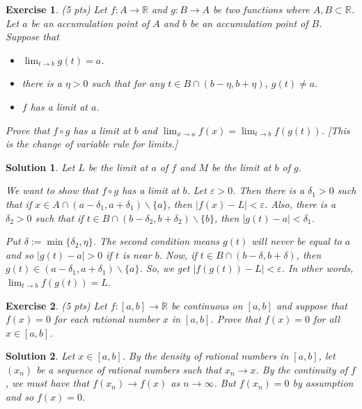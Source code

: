 \documentclass[12pt]{article}
\newcommand{\bR}{\mathbb{R}}
\newcommand{\ra}{\rightarrow}
\theoremstyle{plain}
\newtheorem{exer}{\textbf{Exercise}}}
\theoremstyle{plain}
\newtheorem*{sol}{\textbf{Solution}}}
\theoremstyle{plain}
\theoremstyle{plain}
\begin{document}
\begin{exer}
(5 pts)
Let $f : A \ra \bR$ and $g : B \ra A$ be two functions where $A, B \subset \bR$. Let $a$ be an accumulation point of $A$ and $b$ be an accumulation point of $B$. Suppose that
	\begin{itemize}
	\item $\lim_{t \ra b} g(t) = a$.
	\item there is a $\eta > 0$ such that for any $t \in B \cap (b - \eta ,  b + \eta )$, $g(t) \neq a$.
	\item $f$ has a limit at $a$.
	\end{itemize}
Prove that $f \circ g$ has a limit at $b$ and $\lim_{x \ra a} f(x) = \lim_{t \ra b} f(g(t))$. [This is the change of variable rule for limits.]
\end{exer}
\begin{sol}
Let $L$ be the limit at $a$ of $f$ and $M$ be the limit at $b$ of $g$.

We want to show that $f \circ g$ has a limit at $b$. Let $\varepsilon > 0$. Then there is a $\delta_1 > 0$ such that if $x \in A \cap (a - \delta_1 , a + \delta_1 ) \backslash \{ a \}$, then $|f(x) - L| < \varepsilon$. Also, there is a $\delta_2 > 0$ such that if $t \in B \cap (b - \delta_2 , b + \delta_2 )\backslash \{ b \}$, then $|g(t) - a| < \delta_1$. 

Put $\delta := \min \{ \delta_2 , \eta \}$. The second condition means $g(t)$ will never be equal to $a$ and so $|g(t) - a| > 0$ if $t$ is near $b$. Now, if $t \in B \cap (b - \delta , b + \delta )$, then $g(t) \in (a - \delta_1 , a + \delta_1 ) \backslash \{ a \}$. So, we get $|f(g(t)) - L| < \varepsilon$. In other words, $\lim_{t \ra b} f(g(t)) = L$.
\end{sol}

\begin{exer}
(5 pts)
Let $f : [a, b] \ra \bR$ be continuous on $[a, b]$ and suppose that $f(x) = 0$ for each rational number $x$ in $[a, b]$. Prove that $f(x) = 0$ for all $x \in [a, b]$.
\end{exer}
\begin{sol}
Let $x \in [a, b]$. By the density of rational numbers in $[a, b]$, let $(x_n)$ be a sequence of rational numbers such that $x_n \ra x$. By the continuity of $f$, we must have that $f(x_n) \ra f(x)$ as $n \ra \infty$. But $f(x_n) = 0$ by assumption and so $f(x) = 0$.
\end{sol}
\end{document}

